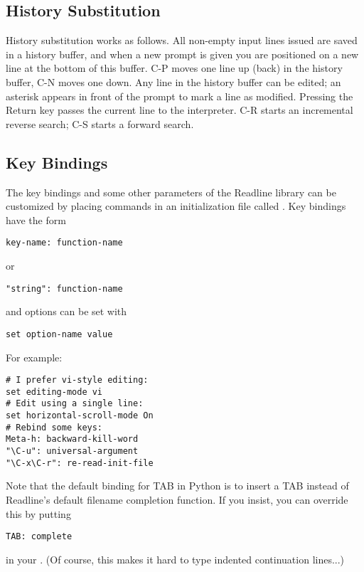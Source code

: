 \subsection{History Substitution}

History substitution works as follows.  All non-empty input lines
issued are saved in a history buffer, and when a new prompt is given
you are positioned on a new line at the bottom of this buffer.  C-P
moves one line up (back) in the history buffer, C-N moves one down.
Any line in the history buffer can be edited; an asterisk appears in
front of the prompt to mark a line as modified.  Pressing the Return
key passes the current line to the interpreter.  C-R starts an
incremental reverse search; C-S starts a forward search.

\subsection{Key Bindings}

The key bindings and some other parameters of the Readline library can
be customized by placing commands in an initialization file called
.  Key bindings have the form

\bcode\begin{verbatim}
key-name: function-name
\end{verbatim}\ecode
%
or

\bcode\begin{verbatim}
"string": function-name
\end{verbatim}\ecode
%
and options can be set with

\bcode\begin{verbatim}
set option-name value
\end{verbatim}\ecode
%
For example:

\bcode\begin{verbatim}
# I prefer vi-style editing:
set editing-mode vi
# Edit using a single line:
set horizontal-scroll-mode On
# Rebind some keys:
Meta-h: backward-kill-word
"\C-u": universal-argument
"\C-x\C-r": re-read-init-file
\end{verbatim}\ecode
%
Note that the default binding for TAB in Python is to insert a TAB
instead of Readline's default filename completion function.  If you
insist, you can override this by putting

\bcode\begin{verbatim}
TAB: complete
\end{verbatim}\ecode
%
in your .  (Of course, this makes it hard to type
indented continuation lines...)

